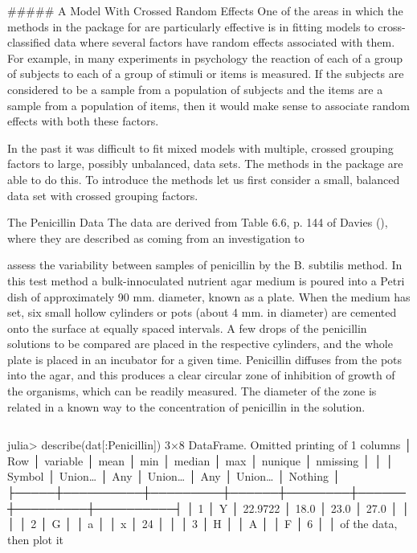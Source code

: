 
##### A Model With Crossed Random Effects
One of the areas in which the methods in the package for are particularly effective is in fitting models to cross-classified data where several factors have random effects associated with them. For example, in many experiments in psychology the reaction of each of a group of subjects to each of a group of stimuli or items is measured. If the subjects are considered to be a sample from a population of subjects and the items are a sample from a population of items, then it would make sense to associate random effects with both these factors.

In the past it was difficult to fit mixed models with multiple, crossed grouping factors to large, possibly unbalanced, data sets. The methods in the package are able to do this. To introduce the methods let us first consider a small, balanced data set with crossed grouping factors.

The Penicillin Data
The data are derived from Table 6.6, p. 144 of Davies (), where they are described as coming from an investigation to

assess the variability between samples of penicillin by the B. subtilis method. In this test method a bulk-innoculated nutrient agar medium is poured into a Petri dish of approximately 90 mm. diameter, known as a plate. When the medium has set, six small hollow cylinders or pots (about 4 mm. in diameter) are cemented onto the surface at equally spaced intervals. A few drops of the penicillin solutions to be compared are placed in the respective cylinders, and the whole plate is placed in an incubator for a given time. Penicillin diffuses from the pots into the agar, and this produces a clear circular zone of inhibition of growth of the organisms, which can be readily measured. The diameter of the zone is related in a known way to the concentration of penicillin in the solution.

\begin{framed}
\begin{verbatim}

\end{verbatim}
\end{framed}

julia> describe(dat[:Penicillin])
3×8 DataFrame. Omitted printing of 1 columns
│ Row │ variable │ mean    │ min  │ median │ max  │ nunique │ nmissing │
│     │ Symbol   │ Union…  │ Any  │ Union… │ Any  │ Union…  │ Nothing  │
├─────┼──────────┼─────────┼──────┼────────┼──────┼─────────┼──────────┤
│ 1   │ Y        │ 22.9722 │ 18.0 │ 23.0   │ 27.0 │         │          │
│ 2   │ G        │         │ a    │        │ x    │ 24      │          │
│ 3   │ H        │         │ A    │        │ F    │ 6       │          │
of the data, then plot it

